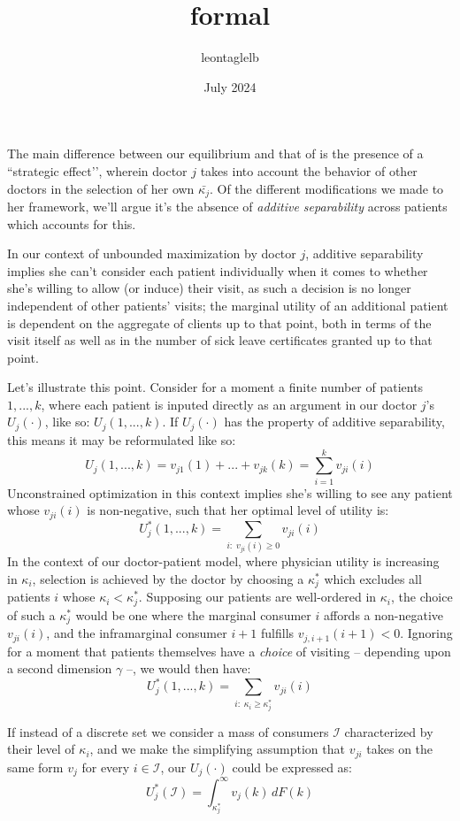 \documentclass{article}
\title{formal}
\author{leontaglelb }
\date{July 2024}
\begin{document}
The main difference between our equilibrium and that of \cite{schnell2017physician} is the presence of a ``strategic effect’’, wherein doctor $j$ takes into account the behavior of other doctors in the selection of her own $\bar{\kappa_j}$. Of the different modifications we made to her framework, we’ll argue it’s the absence of \textit{additive separability} across patients which accounts for this.

In our context of unbounded maximization by doctor $j$, additive separability implies she can’t consider each patient individually when it comes to whether she’s willing to allow (or induce) their visit, as such a decision is no longer independent of other patients’ visits; the marginal utility of an additional patient is dependent on the aggregate of clients up to that point, both in terms of the visit itself as well as in the number of sick leave certificates granted up to that point.




Let’s illustrate this point. Consider for a moment a finite number of patients $1, ... , k$, where each patient is inputed directly as an argument in our doctor $j$’s $U_j(\cdot)$, like so: $U_j(1, ..., k)$. If $U_j(\cdot)$ has the property of additive separability, this means it may be reformulated like so:
\[
U_j(1, ...,k) = v_{j1}(1) + ... + v_{jk}(k) = \sum_{i = 1}^{k} v_{ji}(i)
\]
Unconstrained optimization in this context implies she’s willing to see any patient whose $v_{ji}(i)$ is non-negative, such that her optimal level of utility is:
\[
U_j^*(1, ...,k) =  \sum_{i : \; v_{ji}(i) \geq 0} v_{ji}(i)
\]
In the context of our doctor-patient model, where physician utility is increasing in $\kappa_i$, selection is achieved by the doctor by choosing a $\kappa_j^*$ which excludes all patients $i$ whose $\kappa_i < \kappa_j^*$. Supposing our patients are well-ordered in $\kappa_i$, the choice of such a $\kappa_j^*$ would be one where the marginal consumer $i$ affords a non-negative $v_{ji}(i)$, and the inframarginal consumer $i + 1$ fulfills $v_{j,i+1}(i+1) < 0$. Ignoring for a moment that patients themselves have a \textit{choice} of visiting -- depending upon a second dimension $\gamma$ --, we would then have:
\[
U_j^*(1, ...,k) =  \sum_{i : \; \kappa_i \geq \kappa_j^*} v_{ji}(i)
\]

If instead of a discrete set we consider a mass of consumers $\mathcal{I}$ characterized by their level of $\kappa_i$, and we make the simplifying assumption that $v_{ji}$ takes on the same form $v_{j}$ for every $i \in \mathcal{I}$, our $U_j(\cdot)$ could be expressed as:
\[
U_j^*(\mathcal{I}) =\int_{\kappa_j^*}^{\infty} v_{j}(k) \, dF(k)
\]
\end{document}

